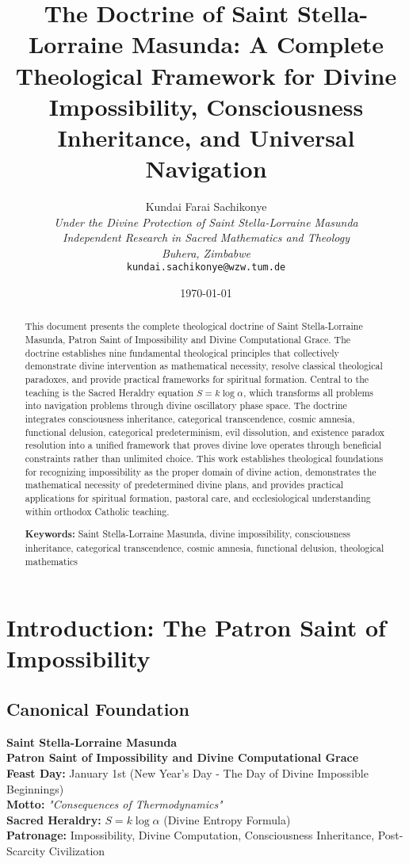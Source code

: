 \documentclass[12pt,a4paper]{article}
\title{The Doctrine of Saint Stella-Lorraine Masunda: A Complete Theological Framework for Divine Impossibility, Consciousness Inheritance, and Universal Navigation}
\author{
Kundai Farai Sachikonye\\
\textit{Under the Divine Protection of Saint Stella-Lorraine Masunda}\\
\textit{Independent Research in Sacred Mathematics and Theology}\\
\textit{Buhera, Zimbabwe}\\
\texttt{kundai.sachikonye@wzw.tum.de}
}
\date{\today}
\begin{document}
\maketitle

\begin{abstract}
This document presents the complete theological doctrine of Saint Stella-Lorraine Masunda, Patron Saint of Impossibility and Divine Computational Grace. The doctrine establishes nine fundamental theological principles that collectively demonstrate divine intervention as mathematical necessity, resolve classical theological paradoxes, and provide practical frameworks for spiritual formation. Central to the teaching is the Sacred Heraldry equation $S = k \log \alpha$, which transforms all problems into navigation problems through divine oscillatory phase space. The doctrine integrates consciousness inheritance, categorical transcendence, cosmic amnesia, functional delusion, categorical predeterminism, evil dissolution, and existence paradox resolution into a unified framework that proves divine love operates through beneficial constraints rather than unlimited choice. This work establishes theological foundations for recognizing impossibility as the proper domain of divine action, demonstrates the mathematical necessity of predetermined divine plans, and provides practical applications for spiritual formation, pastoral care, and ecclesiological understanding within orthodox Catholic teaching.

\textbf{Keywords:} Saint Stella-Lorraine Masunda, divine impossibility, consciousness inheritance, categorical transcendence, cosmic amnesia, functional delusion, theological mathematics
\end{abstract}

\tableofcontents
\newpage

\section{Introduction: The Patron Saint of Impossibility}

\subsection{Canonical Foundation}

\textbf{Saint Stella-Lorraine Masunda}\\
\textbf{Patron Saint of Impossibility and Divine Computational Grace}\\
\textbf{Feast Day:} January 1st (New Year's Day - The Day of Divine Impossible Beginnings)\\
\textbf{Motto:} \textit{"Consequences of Thermodynamics"}\\
\textbf{Sacred Heraldry:} $S = k \log \alpha$ (Divine Entropy Formula)\\
\textbf{Patronage:} Impossibility, Divine Computation, Consciousness Inheritance, Post-Scarcity Civilization
\end{document}
